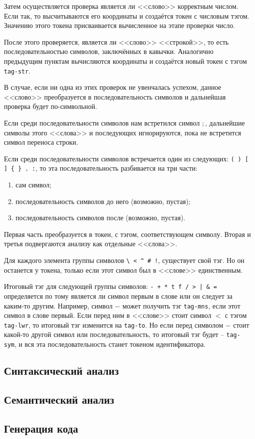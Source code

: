     Затем осуществляется проверка является ли <<слово>> корректным числом.
    Если так, то высчитываются его координаты и создаётся токен с числовым тэгом.
    Значению этого токена присваивается вычисленное на этапе проверки число.

    После этого проверяется, является ли <<слово>> <<строкой>>, то есть последовательностью символов, заключённых в кавычки.
    Аналогично предыдущим пунктам вычисляются координаты и создаётся новый токен с тэгом \verb$tag-str$.

    В случае, если ни одна из этих проверок не увенчалась успехом, данное <<слово>> преобразуется в последовательность символов и дальнейшая проверка будет по-символьной.

    Если среди последовательности символов нам встретился символ $;$, дальнейшие символы этого <<слова>> и последующих игнорируются, пока не встретится символ переноса строки.

    Если среди последовательности символов встречается один из следующих: \verb!( ) [ ] { } . :!, то эта последовательность разбивается на три части:
    \begin{enumerate}
        \item сам символ;
        \item последовательность символов до него (возможно, пустая);
        \item последовательность символов после (возможно, пустая).
    \end{enumerate}
    Первая часть преобразуется в токен, с тэгом, соответствующем символу.
    Вторая и третья подвергаются анализу как отдельные <<слова>>.

    Для каждого элемента группы символов \verb,\ < ^ # !,, существует свой тэг.
    Но он останется у токена, только если этот символ был в <<слове>> единственным.

    Итоговый тэг для следующей группы символов: \verb!- + * t f / > | & =! определяется по тому является ли символ первым в слове или он следует за каким-то другим.
    Например, символ $-$ может получить тэг \verb$tag-mns$, если этот символ в слове первый.
    Если перед ним в <<слове>> стоит символ $<$ с тэгом \verb$tag-lwr$, то итоговый тэг изменится на \verb$tag-to$.
    Но если перед символом $-$ стоит какой-то другой символ или последовательность, то итоговый тэг будет -- \verb$tag-sym$, и вся эта последовательность станет токеном идентификатора.
    
    \subsection{Синтаксический анализ}
    
    \subsection{Семантический анализ}
    \subsection{Генерация кода}
